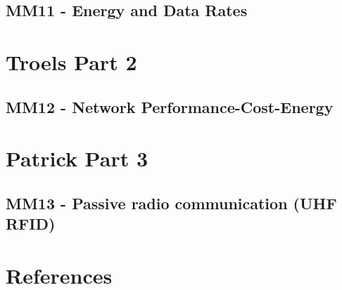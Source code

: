 \chapter{MM11 - Energy and Data Rates}





\part{Troels Part 2}
\chapter{MM12 - Network Performance-Cost-Energy}




\part{Patrick Part 3}
\chapter{MM13 - Passive radio communication (UHF RFID)}




\part{References}






